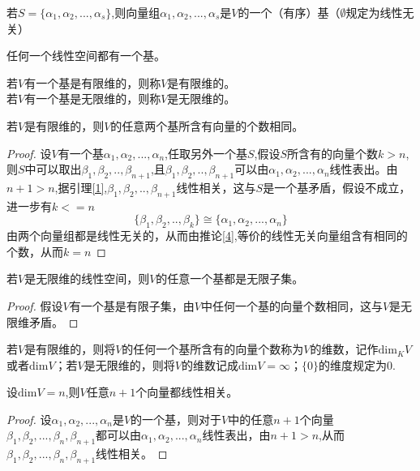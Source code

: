 \documentclass[blue,normal,cn]{elegantnote}
\begin{document}
\begin{theorem}
若$S=\{α_1,α_2,...,α_s\}$,则向量组$α_1,α_2,...,α_s$是$V$的一个（有序）基（$∅$规定为线性无关）

\begin{proposition}
任何一个线性空间都有一个基。
\end{proposition}

\begin{definition}
    若$V$有一个基是有限维的，则称$V$是有限维的。\\
    若$V$有一个基是无限维的，则称$V$是无限维的。
\end{definition}

\begin{theorem}
    \label{thr_2}
    若$V$是有限维的，则$V$的任意两个基所含有向量的个数相同。
\end{theorem}

\begin{proof}
    设$V$有一个基$ α_1,α_2,...,α_n$,任取另外一个基$S$,假设$S$所含有的向量个数$k>n$,则$S$中可以取出$β_1,β_2,..,β_{n+1}$,且$β_1,β_2,..,β_{n+1}$可以由$ α_1,α_2,...,α_n$线性表出。由$n+1>n$,据引理\ref{1},$β_1,β_2,..,β_{n+1}$线性相关，这与$S$是一个基矛盾，假设不成立，进一步有$k<=n$
    \begin{equation*}
        \{β_1,β_2,..,β_{k}\} \cong \{α_1,α_2,...,α_n\}
    \end{equation*}
    由两个向量组都是线性无关的，从而由推论\ref{4},等价的线性无关向量组含有相同的个数，从而$k=n$
\end{proof}

\begin{corollary}
    若$V$是无限维的线性空间，则$V$的任意一个基都是无限子集。 
\end{corollary}

\begin{proof} 
    假设$V$有一个基是有限子集，由$V$中任何一个基的向量个数相同，这与$V$是无限维矛盾。
\end{proof}


\begin{definition}
    若$V$是有限维的，则将$V$的任何一个基所含有的向量个数称为$V$的维数，记作$\mathrm{dim}_K V$或者$\mathrm{dim} V$；若$V$是无限维的，则将$V$的维数记成$\mathrm{dim} V=∞$；$\{0\}$的维度规定为0.
\end{definition}

\begin{proposition}
    \label{12}
    设$\mathrm{dim} V=n$,则$V$任意$n+1$个向量都线性相关。
\end{proposition}

\begin{proof}
    设$α_1,α_2,...,α_n$是$V$的一个基，则对于$V$中的任意$n+1$个向量$β_1,β_2,...,β_n,β_{n+1}$都可以由$α_1,α_2,...,α_n$线性表出，由$n+1>n$,从而$β_1,β_2,...,β_n,β_{n+1}$线性相关。
\end{proof}


\end{theorem}
\end{document}
